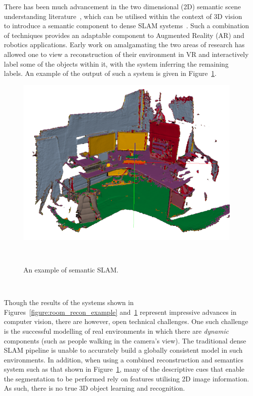 There has been much advancement in the two dimensional (2D) semantic scene understanding literature~\cite{Girshick2014,Shelhamer2017,Civera2011}, 
which can be utilised within the context of 3D vision to introduce a semantic component to dense SLAM 
systems~\cite{Valentin2015,Golodetz2015,Cavallari2016}. Such a combination of techniques 
provides an adaptable component to Augmented Reality (AR) and robotics applications. Early work on amalgamating the two areas 
of research has allowed one to view a reconstruction of their environment in VR and interactively label some of the objects within it, with 
the system inferring the remaining labels. An example of the output of such a system is given in Figure~\ref{figure:spaint_teaser}.
\begin{figure}[!htbp]
  \centering
  \includegraphics[width=.8\linewidth]{figures/intro/spaint-teaser.png}
  \caption[Room Scale Dense Reconstruction]{An example of semantic SLAM.\footnotemark}
~\label{figure:spaint_teaser}
\end{figure}

~

Though the results of the systems shown in Figures~\ref{figure:room_recon_example} and~\ref{figure:spaint_teaser} 
represent impressive advances in computer vision, there are however, open technical challenges. One such 
challenge is the successful modelling of real environments in which there are \textit{dynamic} components (such as 
people walking in the camera's view). The traditional dense SLAM pipeline is unable to accurately build a 
globally consistent model in such environments. In addition, when using a combined reconstruction and 
semantics system such as that shown in Figure~\ref{figure:spaint_teaser}, many of the descriptive cues that 
enable the segmentation to be performed rely on features utilising 2D image information. As such, there is 
no true 3D object learning and recognition.

